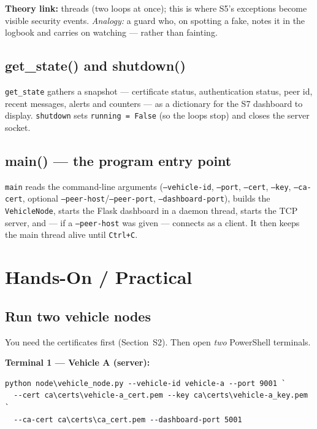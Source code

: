 \documentclass[11pt,a4paper]{report}
\begin{document}
\textbf{Theory link:} threads (two loops at once); this is where S5's exceptions
become visible security events. \emph{Analogy:} a guard who, on spotting a fake,
notes it in the logbook and carries on watching --- rather than fainting.

\subsection{get\_state() and shutdown()}
\texttt{get\_state} gathers a snapshot --- certificate status, authentication
status, peer id, recent messages, alerts and counters --- as a dictionary for the
S7 dashboard to display. \texttt{shutdown} sets \texttt{running = False} (so the
loops stop) and closes the server socket.

\subsection{main() --- the program entry point}
\texttt{main} reads the command-line arguments (\texttt{--vehicle-id},
\texttt{--port}, \texttt{--cert}, \texttt{--key}, \texttt{--ca-cert},
optional \texttt{--peer-host}/\texttt{--peer-port}, \texttt{--dashboard-port}),
builds the \texttt{VehicleNode}, starts the Flask dashboard in a daemon thread,
starts the TCP server, and --- if a \texttt{--peer-host} was given --- connects
as a client. It then keeps the main thread alive until \texttt{Ctrl+C}.

\section{Hands-On / Practical}

\subsection{Run two vehicle nodes}
You need the certificates first (Section~S2). Then open \emph{two} PowerShell
terminals.

\textbf{Terminal 1 --- Vehicle A (server):}
\begin{lstlisting}[style=term]
python node\vehicle_node.py --vehicle-id vehicle-a --port 9001 `
  --cert ca\certs\vehicle-a_cert.pem --key ca\certs\vehicle-a_key.pem `
  --ca-cert ca\certs\ca_cert.pem --dashboard-port 5001
\end{lstlisting}
\end{document}
